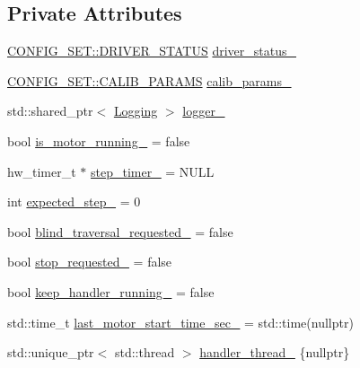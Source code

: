 \subsection*{Private Attributes}
\begin{DoxyCompactItemize}
\item 
\hyperlink{namespaceCONFIG__SET_a722f4ba49e35faf1a2504aa23677b2f0}{C\+O\+N\+F\+I\+G\+\_\+\+S\+E\+T\+::\+D\+R\+I\+V\+E\+R\+\_\+\+S\+T\+A\+T\+US} \hyperlink{classMotorDriver_ad99c6f2f224f78428b137f7856cfba4b}{driver\+\_\+status\+\_\+}
\item 
\hyperlink{structCONFIG__SET_1_1CALIB__PARAMS}{C\+O\+N\+F\+I\+G\+\_\+\+S\+E\+T\+::\+C\+A\+L\+I\+B\+\_\+\+P\+A\+R\+A\+MS} \hyperlink{classMotorDriver_aa2d3e952c7708106df0c86196490a499}{calib\+\_\+params\+\_\+}
\item 
std\+::shared\+\_\+ptr$<$ \hyperlink{classLogging}{Logging} $>$ \hyperlink{classMotorDriver_a6c443fae635cf2b50bfa205ac4f6418e}{logger\+\_\+}
\item 
bool \hyperlink{classMotorDriver_abbc66ce217161de9ed45003718cd6c0e}{is\+\_\+motor\+\_\+running\+\_\+} = false
\item 
hw\+\_\+timer\+\_\+t $\ast$ \hyperlink{classMotorDriver_a86d3f7015a61c62463ea3e718c5bba1c}{step\+\_\+timer\+\_\+} = N\+U\+LL
\item 
int \hyperlink{classMotorDriver_a140b9b922847586721725b7e76943c1e}{expected\+\_\+step\+\_\+} = 0
\item 
bool \hyperlink{classMotorDriver_acc772188969ac8c859d1e9c800eb0076}{blind\+\_\+traversal\+\_\+requested\+\_\+} = false
\item 
bool \hyperlink{classMotorDriver_a6c190777a6bcad1ea12f73707ed67de9}{stop\+\_\+requested\+\_\+} = false
\item 
bool \hyperlink{classMotorDriver_a930d873aa0a5961bd49b8b68553f5044}{keep\+\_\+handler\+\_\+running\+\_\+} = false
\item 
std\+::time\+\_\+t \hyperlink{classMotorDriver_a938712bd2b784e0db660fdb30ad312af}{last\+\_\+motor\+\_\+start\+\_\+time\+\_\+sec\+\_\+} = std\+::time(nullptr)
\item 
std\+::unique\+\_\+ptr$<$ std\+::thread $>$ \hyperlink{classMotorDriver_aec36906063e5e09d5bb7f7843f526874}{handler\+\_\+thread\+\_\+} \{nullptr\}
\end{DoxyCompactItemize}
